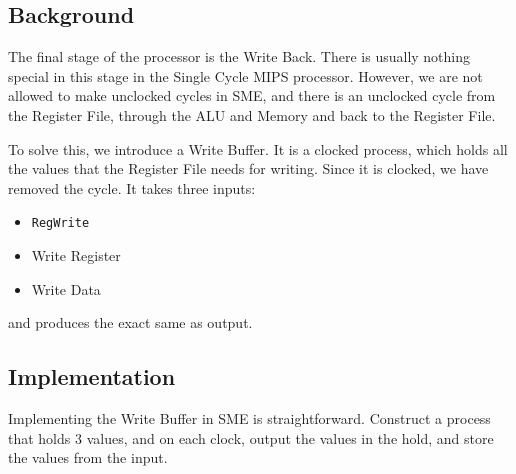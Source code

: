 \documentclass{beamer}
\begin{document}
\subsection{Background}
\begin{frame}
    The final stage of the processor is the Write Back. There is usually
    nothing special in this stage in the Single Cycle MIPS processor. However,
    we are not allowed to make unclocked cycles in SME, and there is an
    unclocked cycle from the Register File, through the ALU and Memory and back
    to the Register File.

    \vspace{\baselineskip}
    To solve this, we introduce a Write Buffer. It is a clocked process, which
    holds all the values that the Register File needs for writing. Since it is
    clocked, we have removed the cycle. It takes three inputs:
    \begin{itemize}
        \item \texttt{RegWrite}
        \item Write Register
        \item Write Data
    \end{itemize}
    and produces the exact same as output.
\end{frame}
\begin{frame}
    \begin{figure}
    \end{figure}
\end{frame}
\subsection{Implementation}
\begin{frame}
    Implementing the Write Buffer in SME is straightforward. Construct a
    process that holds 3 values, and on each clock, output the values in the
    hold, and store the values from the input.
\end{frame}
\end{document}
